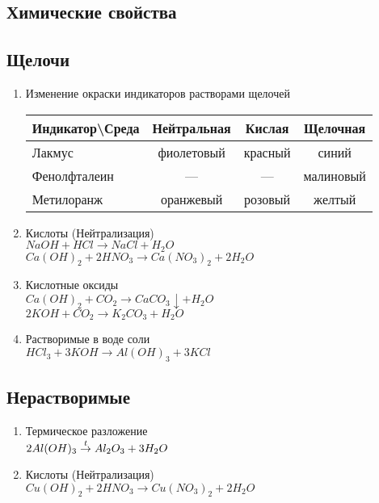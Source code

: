\subsection{Химические свойства}
\subsection{Щелочи}
\begin{enumerate}
    \item Изменение окраски индикаторов растворами щелочей\\
    \begin{tabular}{| l | c | c | c |}
        \hline
        Индикатор\textbackslash Среда & Нейтральная & Кислая & Щелочная \\
        \hline
        Лакмус & фиолетовый & красный & синий \\
        \hline
        Фенолфталеин & --- & --- & малиновый \\
        \hline
        Метилоранж & оранжевый & розовый & желтый \\
        \hline
    \end{tabular}

    \item Кислоты (Нейтрализация)\\
        $NaOH + HCl \rightarrow NaCl + H_2O$\\
        $Ca(OH)_2 + 2HNO_3 \rightarrow Ca(NO_3)_2 + 2H_2O$

    \item Кислотные оксиды\\
        $Ca(OH)_2 + CO_2 \rightarrow CaCO_3\downarrow + H_2O$\\
        $2KOH + CO_2 \rightarrow K_2CO_3 + H_2O$

    \item Растворимые в воде соли\\
        $HCl_3 + 3KOH \rightarrow Al(OH)_3 + 3KCl$

\end{enumerate}


\subsection{Нерастворимые}
\begin{enumerate}
    \item Термическое разложение \\
        $2Al(OH)_3 \stackrel{t}{\rightarrow} Al_2O_3 + 3H_2O$

    \item Кислоты (Нейтрализация)\\
        $Cu(OH)_2 + 2HNO_3 \rightarrow Cu(NO_3)_2 + 2H_2O$
\end{enumerate}
